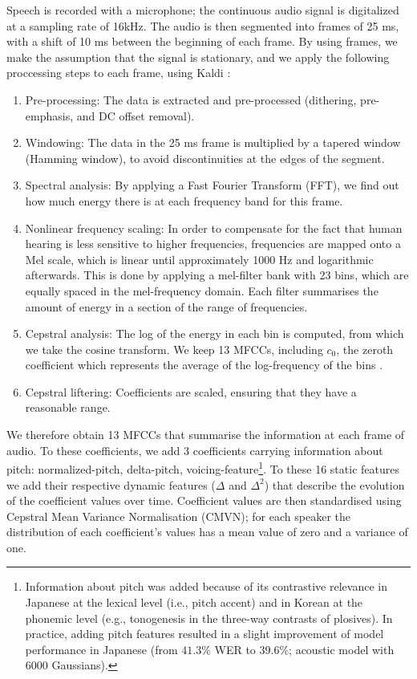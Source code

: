 Speech is recorded with a microphone; the continuous audio signal is digitalized at a sampling rate of 16kHz.
The audio is then segmented into frames of 25 ms, with a shift of 10 ms between the beginning of each frame. By using frames, we make the assumption that the signal is stationary, and we apply the following proccessing steps to each frame, using Kaldi \cite{povey2011}:

\begin{enumerate}
\item Pre-processing: The data is extracted and pre-processed (dithering, pre-emphasis, and DC offset removal).
\item Windowing: The data in the 25 ms frame is multiplied by a tapered window (Hamming window), to avoid discontinuities at the edges of the segment.
\item Spectral analysis: By applying a Fast Fourier Transform (FFT), we find out how much energy there is at each frequency band for this frame.
\item Nonlinear frequency scaling: In order to compensate for the fact that human hearing is less sensitive to higher frequencies, frequencies are mapped onto a Mel scale, which is linear until approximately 1000 Hz and logarithmic afterwards. This is done by applying a mel-filter bank with 23 bins, which are equally spaced in the mel-frequency domain. Each filter summarises the amount of energy in a section of the range of frequencies. 
\item Cepstral analysis: The log of the energy in each bin is computed, from which we take the cosine transform. We keep 13 MFCCs, including $c_{0}$, the zeroth coefficient which represents the average of the log-frequency of the bins \cite{gales2008}.
  \item Cepstral liftering: Coefficients are scaled, ensuring that they have a reasonable range.
\end{enumerate}

We therefore obtain 13 MFCCs that summarise the information at each frame of audio. To these coefficients, we add 3 coefficients carrying information about pitch: normalized-pitch, delta-pitch, voicing-feature\footnote{Information about pitch was added because of its contrastive relevance in Japanese at the lexical level (i.e., pitch accent) and in Korean at the phonemic level (e.g., tonogenesis in the three-way contrasts of plosives). In practice, adding pitch features resulted in a slight improvement of model performance in Japanese (from $41.3\%$ WER to $39.6\%$; acoustic model with 6000 Gaussians).}.
To these 16 static features we add their respective dynamic features ($\Delta$ and $\Delta^2$) that describe the evolution of the coefficient values over time. 
Coefficient values are then standardised using Cepstral Mean Variance Normalisation (CMVN); for each speaker the distribution of each coefficient's values has a mean value of zero and a variance of one. 

